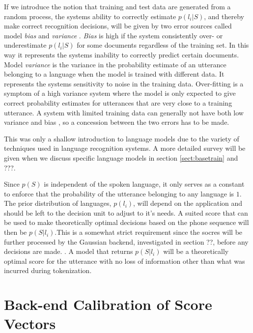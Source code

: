 If we introduce the notion that training and test data are generated from a random process, the systems ability to correctly estimate $p(l_i | S)$, and thereby make correct recognition decisions, will be given by two error sources called model \emph{bias} and \emph{variance} \cite[149]{machinelearningbook}. \emph{Bias} is high if the system consistently over- or underestimate $p(l_i | S)$ for some documents regardless of the training set. In this way it represents the systems inability to correctly predict certain documents. Model \emph{variance} is the variance in the probability estimate of an utterance belonging to a language when the model is trained with different data. It represents the systems sensitivity to noise in the training data. Over-fitting is a symptom of a high variance system where the model is only expected to give correct probability estimates for utterances that are very close to a training utterance. A system with limited training data can generally not have both low variance and bias \cite[312]{information}, so a concession between the two errors has to be made.

This was only a shallow introduction to language models due to the variety of techniques used in language recognition systems. A more detailed survey will be given when we discuss specific language models in section \ref{sect:basetrain} and ???.




Since $p(S)$ is independent of the spoken language, it only serves as a constant to enforce that the probability of the utterance belonging to any language is $1$. The prior distribution of languages, $p(l_i)$, will depend on the application and should be left to the decision unit to adjust to it's needs. A suited score that can be used to make theoretically optimal decisions based on the phone sequence will then be $p(S|l_i)$.This is a somewhat strict requirement since the socres will be further processed by the Gaussian backend, investigated in section ??, before any decisions are made. . A model that returns $p(S|l_i)$ will be a theoretically optimal score for the utterance with no loss of information other than what was incurred during tokenization.




\section{Back-end Calibration of Score Vectors}
\label{sect:backendscoring}

